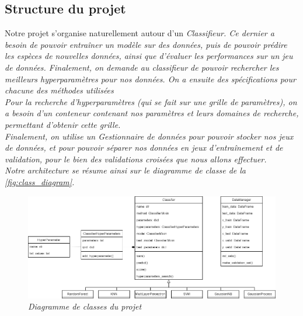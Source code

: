 \subsection{Structure du projet}

Notre projet s'organise naturellement autour d'un \it{Classifieur}. Ce dernier a besoin de pouvoir entraîner un modèle sur des données, puis de pouvoir prédire les espèces de nouvelles données, ainsi que d'évaluer les performances sur un jeu de données. Finalement, on demande au classifieur de pouvoir rechercher les meilleurs hyperparamètres pour nos données. On a ensuite des spécifications pour chacune des méthodes utilisées\\

Pour la recherche d'hyperparamètres (qui se fait sur une grille de paramètres), on a besoin d'un conteneur contenant nos paramètres et leurs domaines de recherche, permettant d'obtenir cette grille.\\

Finalement, on utilise un \it{Gestionnaire de données} pour pouvoir stocker nos jeux de données, et pour pouvoir séparer nos données en jeux d'entraînement et de validation, pour le bien des validations croisées que nous allons effectuer.\\

Notre architecture se résume ainsi sur le diagramme de classe de la \autoref{fig:class_diagram}.

\begin{figure}[h]
    \centering
    \includegraphics[scale=0.48]{Images/graphiques/class_diagram.png}
    \caption{\it{Diagramme de classes du projet}}
    \label{fig:class_diagram}
\end{figure}